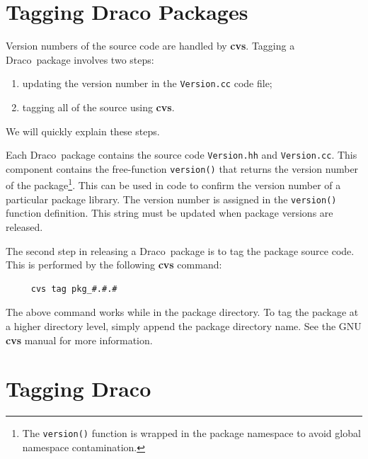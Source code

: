 \documentclass[11pt]{nmemo}
\newcommand{\draco}{{\normalfont\normalsize\textsf Draco}}
\begin{document}

\section{Tagging Draco Packages}

Version numbers of the source code are handled by {\bf cvs}.  Tagging
a \draco\ package involves two steps:
\begin{enumerate}
\item updating the version number in the \texttt{Version.cc} code
  file;
\item tagging all of the source using {\bf cvs}.
\end{enumerate}
We will quickly explain these steps.

Each \draco\ package contains the source code \texttt{Version.hh} and
\texttt{Version.cc}.  This component contains the free-function
\texttt{version()} that returns the version number of the
package\footnote{The \texttt{version()} function is wrapped in the
  package namespace to avoid global namespace contamination.}.  This
can be used in code to confirm the version number of a particular
package library.  The version number is assigned in the
\texttt{version()} function definition.  This string must be updated
when package versions are released.

The second step in releasing a \draco\ package is to tag the package
source code.  This is performed by the following {\bf cvs} command:
\begin{verbatim}
     cvs tag pkg_#.#.#
\end{verbatim}
The above command works while in the package directory.  To tag the
package at a higher directory level, simply append the package
directory name.  See the GNU {\bf cvs} manual for more information.


\section{Tagging Draco}
\end{document}
